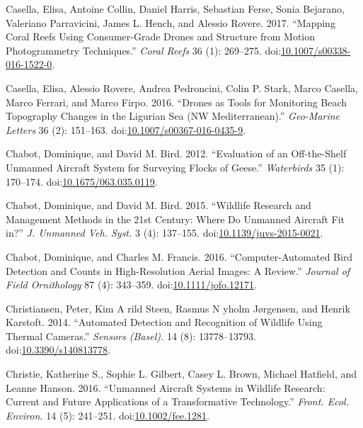 \documentclass[]{interact}
\theoremstyle{plain}%
\theoremstyle{definition}
\theoremstyle{remark}
\begin{document}
\hypertarget{ref-casella_mapping_2017}{}
Casella, Elisa, Antoine Collin, Daniel Harris, Sebastian Ferse, Sonia
Bejarano, Valeriano Parravicini, James L. Hench, and Alessio Rovere.
2017. ``Mapping Coral Reefs Using Consumer-Grade Drones and Structure
from Motion Photogrammetry Techniques.'' \emph{Coral Reefs} 36 (1):
269--275.
doi:\href{https://doi.org/10.1007/s00338-016-1522-0}{10.1007/s00338-016-1522-0}.

\hypertarget{ref-casella_drones_2016}{}
Casella, Elisa, Alessio Rovere, Andrea Pedroncini, Colin P. Stark, Marco
Casella, Marco Ferrari, and Marco Firpo. 2016. ``Drones as Tools for
Monitoring Beach Topography Changes in the Ligurian Sea (NW
Mediterranean).'' \emph{Geo-Marine Letters} 36 (2): 151--163.
doi:\href{https://doi.org/10.1007/s00367-016-0435-9}{10.1007/s00367-016-0435-9}.

\hypertarget{ref-chabot_evaluation_2012}{}
Chabot, Dominique, and David M. Bird. 2012. ``Evaluation of an
Off-the-Shelf Unmanned Aircraft System for Surveying Flocks of Geese.''
\emph{Waterbirds} 35 (1): 170--174.
doi:\href{https://doi.org/10.1675/063.035.0119}{10.1675/063.035.0119}.

\hypertarget{ref-chabot_wildlife_2015}{}
Chabot, Dominique, and David M. Bird. 2015. ``Wildlife Research and
Management Methods in the 21st Century: Where Do Unmanned Aircraft Fit
in?'' \emph{J. Unmanned Veh. Syst.} 3 (4): 137--155.
doi:\href{https://doi.org/10.1139/juvs-2015-0021}{10.1139/juvs-2015-0021}.

\hypertarget{ref-chabot_computer-automated_2016}{}
Chabot, Dominique, and Charles M. Francis. 2016. ``Computer-Automated
Bird Detection and Counts in High-Resolution Aerial Images: A Review.''
\emph{Journal of Field Ornithology} 87 (4): 343--359.
doi:\href{https://doi.org/10.1111/jofo.12171}{10.1111/jofo.12171}.

\hypertarget{ref-christiansen_automated_2014}{}
Christiansen, Peter, Kim A rild Steen, Rasmus N yholm Jørgensen, and
Henrik Karstoft. 2014. ``Automated Detection and Recognition of Wildlife
Using Thermal Cameras.'' \emph{Sensors (Basel).} 14 (8): 13778--13793.
doi:\href{https://doi.org/10.3390/s140813778}{10.3390/s140813778}.

\hypertarget{ref-christie_unmanned_2016}{}
Christie, Katherine S., Sophie L. Gilbert, Casey L. Brown, Michael
Hatfield, and Leanne Hanson. 2016. ``Unmanned Aircraft Systems in
Wildlife Research: Current and Future Applications of a Transformative
Technology.'' \emph{Front. Ecol. Environ.} 14 (5): 241--251.
doi:\href{https://doi.org/10.1002/fee.1281}{10.1002/fee.1281}.
\end{document}
